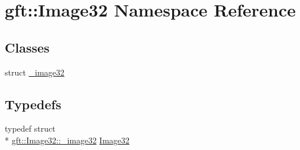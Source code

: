 \hypertarget{namespacegft_1_1Image32}{\section{gft\-:\-:Image32 Namespace Reference}
\label{namespacegft_1_1Image32}
}
\subsection*{Classes}
\begin{DoxyCompactItemize}
\item 
struct \hyperlink{structgft_1_1Image32_1_1__image32}{\-\_\-image32}
\end{DoxyCompactItemize}
\subsection*{Typedefs}
\begin{DoxyCompactItemize}
\item 
typedef struct \\*
\hyperlink{structgft_1_1Image32_1_1__image32}{gft\-::\-Image32\-::\-\_\-image32} \hyperlink{namespacegft_1_1Image32_a6c5a03566b593bb406f1fe33266a0382}{Image32}
\end{DoxyCompactItemize}
